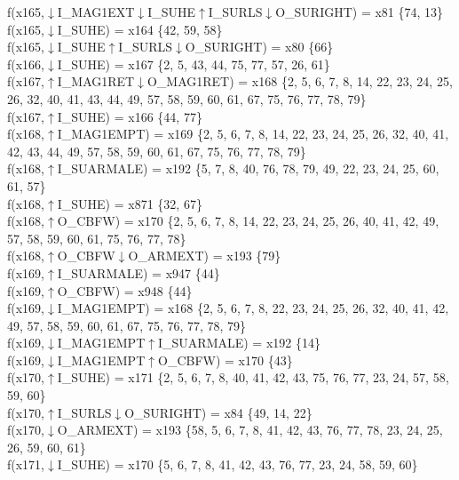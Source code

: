 f(x165,$\downarrow$I\_MAG1EXT$\downarrow$I\_SUHE$\uparrow$I\_SURLS$\downarrow$O\_SURIGHT) = x81 \{74, 13\} \\  
f(x165,$\downarrow$I\_SUHE) = x164 \{42, 59, 58\} \\  
f(x165,$\downarrow$I\_SUHE$\uparrow$I\_SURLS$\downarrow$O\_SURIGHT) = x80 \{66\} \\  
f(x166,$\downarrow$I\_SUHE) = x167 \{2, 5, 43, 44, 75, 77, 57, 26, 61\} \\  
f(x167,$\uparrow$I\_MAG1RET$\downarrow$O\_MAG1RET) = x168 \{2, 5, 6, 7, 8, 14, 22, 23, 24, 25, 26, 32, 40, 41, 43, 44, 49, 57, 58, 59, 60, 61, 67, 75, 76, 77, 78, 79\} \\  
f(x167,$\uparrow$I\_SUHE) = x166 \{44, 77\} \\  
f(x168,$\uparrow$I\_MAG1EMPT) = x169 \{2, 5, 6, 7, 8, 14, 22, 23, 24, 25, 26, 32, 40, 41, 42, 43, 44, 49, 57, 58, 59, 60, 61, 67, 75, 76, 77, 78, 79\} \\  
f(x168,$\uparrow$I\_SUARMALE) = x192 \{5, 7, 8, 40, 76, 78, 79, 49, 22, 23, 24, 25, 60, 61, 57\} \\  
f(x168,$\uparrow$I\_SUHE) = x871 \{32, 67\} \\  
f(x168,$\uparrow$O\_CBFW) = x170 \{2, 5, 6, 7, 8, 14, 22, 23, 24, 25, 26, 40, 41, 42, 49, 57, 58, 59, 60, 61, 75, 76, 77, 78\} \\  
f(x168,$\uparrow$O\_CBFW$\downarrow$O\_ARMEXT) = x193 \{79\} \\  
f(x169,$\uparrow$I\_SUARMALE) = x947 \{44\} \\  
f(x169,$\uparrow$O\_CBFW) = x948 \{44\} \\  
f(x169,$\downarrow$I\_MAG1EMPT) = x168 \{2, 5, 6, 7, 8, 22, 23, 24, 25, 26, 32, 40, 41, 42, 49, 57, 58, 59, 60, 61, 67, 75, 76, 77, 78, 79\} \\  
f(x169,$\downarrow$I\_MAG1EMPT$\uparrow$I\_SUARMALE) = x192 \{14\} \\  
f(x169,$\downarrow$I\_MAG1EMPT$\uparrow$O\_CBFW) = x170 \{43\} \\  
f(x170,$\uparrow$I\_SUHE) = x171 \{2, 5, 6, 7, 8, 40, 41, 42, 43, 75, 76, 77, 23, 24, 57, 58, 59, 60\} \\  
f(x170,$\uparrow$I\_SURLS$\downarrow$O\_SURIGHT) = x84 \{49, 14, 22\} \\  
f(x170,$\downarrow$O\_ARMEXT) = x193 \{58, 5, 6, 7, 8, 41, 42, 43, 76, 77, 78, 23, 24, 25, 26, 59, 60, 61\} \\  
f(x171,$\downarrow$I\_SUHE) = x170 \{5, 6, 7, 8, 41, 42, 43, 76, 77, 23, 24, 58, 59, 60\} \\  
